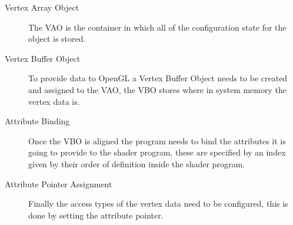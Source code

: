 \begin{description}
\item[Vertex Array Object] The VAO is the container in which all of the configuration
state for the object is stored.
\item[Vertex Buffer Object]
To provide data to OpenGL a Vertex Buffer Object needs to be created
and assigned to the VAO, the VBO stores where in system memory the vertex data 
is. 
\item[Attribute Binding]
Once the VBO is aligned the program needs to bind the attributes it is going
to provide to the shader program, these are specified by an index given by their
order of definition inside the shader program.
\item[Attribute Pointer Assignment]
Finally the access types of the 
vertex data need to be configured, this is done by setting the attribute 
pointer. 
\end{description}


%
